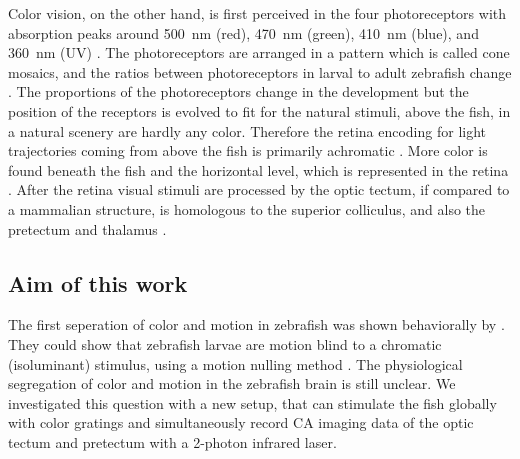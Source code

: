 Color vision, on the other hand, is first perceived in the four photoreceptors with absorption peaks around \SI{500}{\nano\meter} (red), \SI{470}{\nano\meter} (green), \SI{410}{\nano\meter} (blue), and \SI{360}{\nano\meter} (UV) \parencite{robinson1993zebrafish}. The photoreceptors are arranged in a pattern which is called \glqq cone mosaics\grqq{}, and the ratios between photoreceptors in larval to adult zebrafish change \parencite{allison2010ontogeny}. The proportions of the photoreceptors change in the development but the position of the receptors is evolved to fit for the natural stimuli, above the fish, in  a natural scenery are hardly any color. Therefore the retina encoding for light trajectories coming from above the fish is primarily achromatic \parencite{zimmermannZebrafishDifferentiallyProcess2018}. More color is found beneath the fish and the horizontal level, which is represented in the retina \parencite{zimmermannZebrafishDifferentiallyProcess2018}. After the retina visual stimuli are processed by the optic tectum, if compared to a mammalian structure, is homologous to the superior colliculus, and also the pretectum and thalamus \parencite{bollmannZebrafishVisualSystem2019}. 

\subsection{Aim of this work}
The first seperation of color and motion in zebrafish was shown behaviorally by \cite{orgerChannelingRedGreen2005}. They could show that zebrafish larvae are motion blind to a chromatic (isoluminant) stimulus, using a motion nulling method \parencite{chichilniskyFunctionalSegregationColor1993}. The physiological segregation of color and motion in the zebrafish brain is still unclear.  We investigated this question with a new setup, that can stimulate the fish globally with color gratings and simultaneously record  CA imaging data of the optic tectum and pretectum with a 2-photon infrared laser. 




